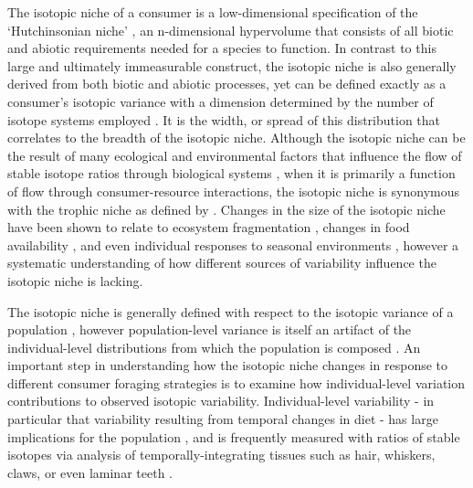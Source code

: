 \documentclass{frontiersSCNS}
\begin{document}
The isotopic niche of a consumer is a low-dimensional specification of the `Hutchinsonian niche' \citep{Hutchinson:1957tg}, an n-dimensional hypervolume that consists of all biotic and abiotic requirements needed for a species to function.
In contrast to this large and ultimately immeasurable construct, the isotopic niche is also generally derived from both biotic and abiotic processes, yet can be defined exactly as a consumer's isotopic variance with a dimension determined by the number of isotope systems employed \citep{Newsome:2007tz}.
It is the width, or spread of this distribution that correlates to the breadth of the isotopic niche.
Although the isotopic niche can be the result of many ecological and environmental factors that influence the flow of stable isotope ratios through biological systems \citep{Araujo:2007iua}, when it is primarily a function of flow through consumer-resource interactions, the isotopic niche is synonymous with the trophic niche as defined by \citet{Bearhop:2004im}.
Changes in the size of the isotopic niche have been shown to relate to ecosystem fragmentation \citep{Layman:2007ky}, changes in food availability \citep{Lehmann:2015db}, and even individual responses to seasonal environments \citep{delRio:2011p2553}, however a systematic understanding of how different sources of variability influence the isotopic niche is lacking.

The isotopic niche is generally defined with respect to the isotopic variance of a population \citep{Araujo:2007iua,Araujo:2009p2286,Fink:2012eg}, however population-level variance is itself an artifact of the individual-level distributions from which the population is composed \citep{Bolnick:2007p1253,Araujo:2011gm}.
An important step in understanding how the isotopic niche changes in response to different consumer foraging strategies is to examine how individual-level variation contributions to observed isotopic variability.
Individual-level variability - in particular that variability resulting from temporal changes in diet - has large implications for the population \citep{Bolnick:2011gj}, and is frequently measured with ratios of stable isotopes via analysis of temporally-integrating tissues such as hair, whiskers, claws, or even laminar teeth \citep{Koch:1995vj,Matthews:2004hw,Sponheimer:2006fj,Post:2008ki,Newsome:2009tn,Yeakel:2009hz,Hopkins:2015ip}.
\end{document}
